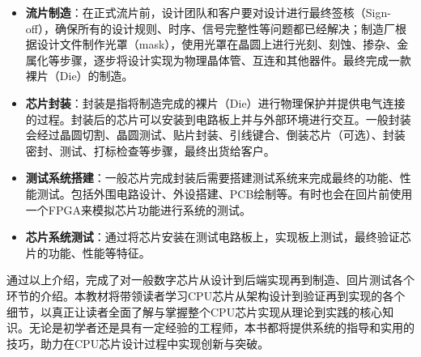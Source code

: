 \begin{itemize}
\tightlist
\item
  \textbf{流片制造}：在正式流片前，设计团队和客户要对设计进行最终签核（Sign-off），确保所有的设计规则、时序、信号完整性等问题都已经解决；制造厂根据设计文件制作光罩（mask），使用光罩在晶圆上进行光刻、刻蚀、掺杂、金属化等步骤，逐步将设计实现为物理晶体管、互连和其他器件。最终完成一款裸片（Die）的制造。
\item
  \textbf{芯片封装}：封装是指将制造完成的裸片（Die）进行物理保护并提供电气连接的过程。封装后的芯片可以安装到电路板上并与外部环境进行交互。一般封装会经过晶圆切割、晶圆测试、贴片封装、引线键合、倒装芯片（可选）、封装密封、测试、打标检查等步骤，最终出货给客户。
\item
  \textbf{测试系统搭建}：一般芯片完成封装后需要搭建测试系统来完成最终的功能、性能测试。包括外围电路设计、外设搭建、PCB绘制等。有时也会在回片前使用一个FPGA来模拟芯片功能进行系统的测试。
\item
  \textbf{芯片系统测试}：通过将芯片安装在测试电路板上，实现板上测试，最终验证芯片的功能、性能等特征。
\end{itemize}

通过以上介绍，完成了对一般数字芯片从设计到后端实现再到制造、回片测试各个环节的介绍。本教材将带领读者学习CPU芯片从架构设计到验证再到实现的各个细节，以真正让读者全面了解与掌握整个CPU芯片实现从理论到实践的核心知识。无论是初学者还是具有一定经验的工程师，本书都将提供系统的指导和实用的技巧，助力在CPU芯片设计过程中实现创新与突破。
